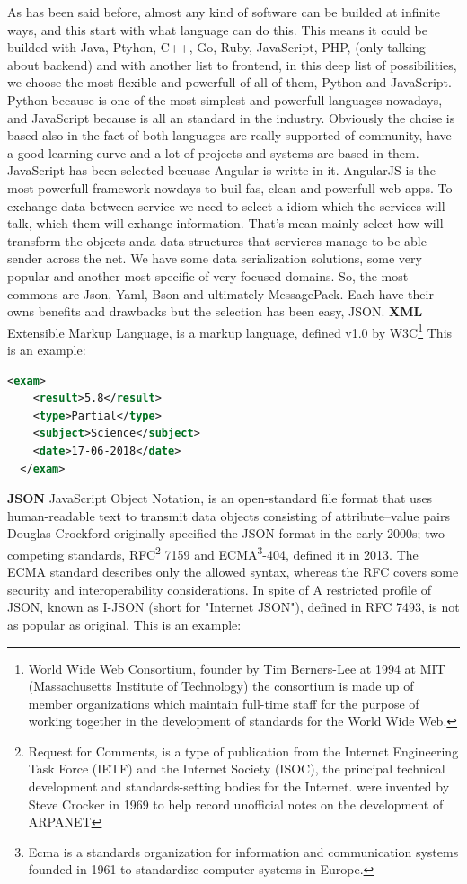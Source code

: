 As has been said before, almost any kind of software can be builded at infinite
ways, and this start with what language can do this. This means it could be
builded with Java, Ptyhon, C++, Go, Ruby, JavaScript, PHP,  (only talking about
backend) and with another list to frontend, in this deep list of possibilities,
we choose the most flexible and powerfull of all of them, Python and JavaScript.
\intro
Python because is one of the most simplest and powerfull languages nowadays, and
JavaScript because is all an standard in the industry. Obviously the choise is
based also in the fact of both languages are really supported of community, have a
good learning curve and a lot of projects and systems are based in them.
\intro
JavaScript has been selected becuase Angular is writte in it. AngularJS is the
most powerfull framework nowdays to buil fas, clean and powerfull web apps.
\intro
To exchange data between service we need to select a idiom which the services
will talk, which them will exhange information. That's mean mainly select how
will transform the objects anda data structures that servicres manage to be able
sender across the net.
\intro
We have some data serialization solutions, some very popular and another most
specific of very focused domains. So, the most commons are Json, Yaml,
Bson and ultimately MessagePack. Each have their owns benefits and drawbacks but
the selection has been easy, JSON.
\intro
\textbf{XML}
\intro
Extensible Markup Language, is a markup language, defined v1.0 by
W3C\footnote{World Wide Web Consortium, founder by Tim Berners-Lee at 1994 at MIT
(Massachusetts Institute of Technology) the consortium is made up of member
organizations which maintain full-time staff for the purpose of working together
in the development of standards for the World Wide Web.} This is an example:

\begin{lstlisting}[language=xml,frame=none,numbers=none]
  <exam>
    <result>5.8</result>
    <type>Partial</type>
    <subject>Science</subject>
    <date>17-06-2018</date>
  </exam>
\end{lstlisting}


\noindent \textbf{JSON}
\intro
JavaScript Object Notation, is an open-standard file format that uses
human-readable text to transmit data objects consisting of attribute–value pairs
Douglas Crockford originally specified the JSON format in the early 2000s;
two competing standards, RFC\footnote{ Request for Comments, is a type of
publication from the Internet Engineering Task Force (IETF) and the Internet
Society (ISOC), the principal technical development and standards-setting bodies
for the Internet. were invented by Steve Crocker in 1969 to help record
unofficial notes on the development of ARPANET} 7159 and ECMA\footnote{Ecma is a
standards organization for information and communication systems founded in 1961
to standardize computer systems in Europe.}-404, defined it in 2013.
The ECMA standard describes only the allowed syntax, whereas the RFC covers some
 security and interoperability considerations.
\intro
In spite of A restricted profile of JSON, known as I-JSON (short for "Internet JSON"),
defined in RFC 7493, is not as popular as original. This is an example:

